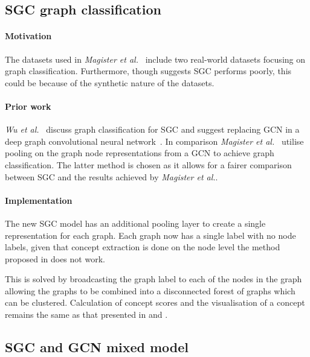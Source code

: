 \subsection{SGC graph classification}
\paragraph{Motivation}
The datasets used in \textit{Magister et al.}~\cite{magister2021gcexplainer} include two real-world datasets focusing on graph classification.
Furthermore, though  suggests SGC performs poorly, this could be because of the synthetic nature of the datasets.

\paragraph{Prior work}
\textit{Wu et al.}~\cite{wu2019simplifying} discuss graph classification for SGC and suggest replacing GCN in a deep graph convolutional neural network~\cite{zhang2018end}.
In comparison \textit{Magister et al.}~\cite{magister2021gcexplainer} utilise pooling on the graph node representations from a GCN to achieve graph classification.
The latter method is chosen as it allows for a fairer comparison between SGC and the results achieved by \textit{Magister et al.}.

\paragraph{Implementation}
The new SGC model has an additional pooling layer to create a single representation for each graph.
Each graph now has a single label with no node labels, given that concept extraction is done on the node level the method proposed in  does not work.

This is solved by broadcasting the graph label to each of the nodes in the graph allowing the graphs to be combined into a disconnected forest of graphs which can be clustered.
Calculation of concept scores and the visualisation of a concept remains the same as that presented in  and .

\subsection{SGC and GCN mixed model}
\label{sec:SGCN-imp}
